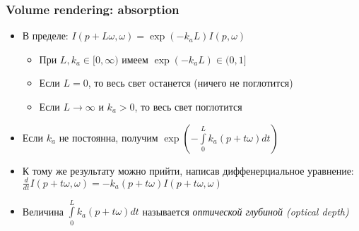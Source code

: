 \documentclass[10pt]{beamer}
\begin{document}
\begin{frame}[fragile]
\frametitle{Volume rendering: absorption}
\begin{itemize}
\item В пределе: \begin{math}I(p + L\omega, \omega) = \exp(- k_a L) I(p, \omega)\end{math}
\pause
\begin{itemize}
\item При \begin{math}L, k_a \in [0, \infty)\end{math} имеем \begin{math}\exp(-k_a L) \in (0, 1]\end{math}
\item Если \begin{math}L = 0\end{math}, то весь свет останется (ничего не поглотится)
\item Если \begin{math}L \rightarrow \infty\end{math} и \begin{math}k_a > 0\end{math}, то весь свет поглотится
\end{itemize}
\pause
\item Если \begin{math}k_a\end{math} не постоянна, получим \begin{math}\exp\left(-\int\limits_0^L k_a(p+t\omega)dt\right)\end{math}
\pause
\item К тому же результату можно прийти, написав диффенерциальное уравнение: \begin{math}\frac{d}{dt}I(p+t\omega,\omega) = -k_a(p+t\omega) I(p+t\omega,\omega)\end{math}
\pause
\item Величина \begin{math}\int\limits_0^L k_a(p+t\omega)dt\end{math} называется \textit{оптической глубиной (optical depth)}
\end{itemize}
\end{frame}
\end{document}
